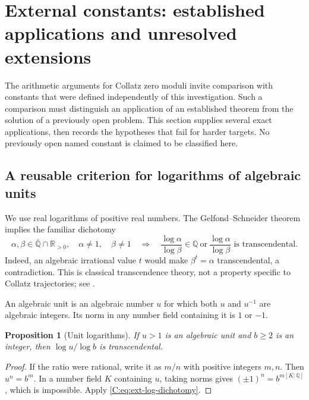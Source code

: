 \documentclass[11pt,a4paper]{article}
\newtheorem{proposition}[theorem]{Proposition}
\theoremstyle{definition}
\theoremstyle{remark}
\numberwithin{equation}{section}
\begin{document}
\section{External constants: established applications and unresolved extensions}
\label{C:sec:ext-targets}

The arithmetic arguments for Collatz zero moduli invite comparison with constants
that were defined independently of this investigation.  Such a comparison must
distinguish an application of an established theorem from the solution of a
previously open problem.  This section supplies several exact applications,
then records the hypotheses that fail for harder targets.  No previously open
named constant is claimed to be classified here.

\subsection{A reusable criterion for logarithms of algebraic units}

We use real logarithms of positive real numbers.  The
Gelfond--Schneider theorem implies the familiar dichotomy
\begin{equation}
 \alpha,\beta\in\overline{\mathbb Q}\cap\mathbb R_{>0},\quad
 \alpha\ne1,\quad\beta\ne1
 \quad\Longrightarrow\quad
 \frac{\log\alpha}{\log\beta}\in\mathbb Q
 \ \text{or}\ 
 \frac{\log\alpha}{\log\beta}\text{ is transcendental}.
 \label{C:eq:ext-log-dichotomy}
\end{equation}
Indeed, an algebraic irrational value $t$ would make $\beta^t=\alpha$
transcendental, a contradiction.  This is classical transcendence theory,
not a property specific to Collatz trajectories; see \cite{R067}.

An algebraic unit is an algebraic number $u$ for which both $u$ and $u^{-1}$
are algebraic integers.  Its norm in any number field containing it is $1$ or
$-1$.

\begin{proposition}[Unit logarithms]
\label{C:prop:ext-unit-log}
If $u>1$ is an algebraic unit and $b\ge2$ is an integer, then
$\log u/\log b$ is transcendental.
\end{proposition}
\begin{proof}
If the ratio were rational, write it as $m/n$ with positive integers $m,n$.
Then $u^n=b^m$.  In a number field $K$ containing $u$, taking norms gives
$(\pm1)^n=b^{m[K:\mathbb Q]}$, which is impossible.  Apply
\eqref{C:eq:ext-log-dichotomy}.
\end{proof}
\end{document}
